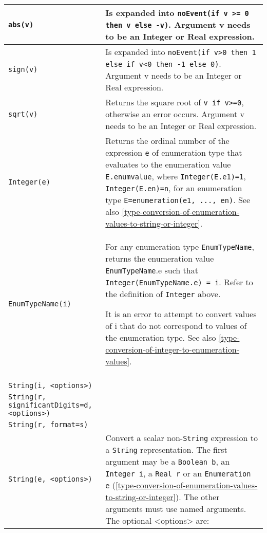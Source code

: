 \begin{longtable}{|p{4.5cm}|p{10cm}|} \hline
\endhead
\lstinline!abs(v)! & Is expanded into \lstinline!noEvent(if v >= 0 then v else -v)!. Argument v needs to be an Integer or Real expression.\\ \hline
\lstinline!sign(v)! & Is expanded into \lstinline!noEvent(if v>0 then 1 else if v<0 then -1 else 0)!. Argument v needs to be an Integer or Real
expression.\\ \hline
\lstinline!sqrt(v)! & Returns the square root of \lstinline!v if v>=0!, otherwise
an error occurs. Argument v needs to be an Integer or Real
expression.\\ \hline

\lstinline!Integer(e)! & Returns the ordinal number of the expression \lstinline!e! of
enumeration type that evaluates to the enumeration value \lstinline!E.enumvalue!,
where \lstinline!Integer(E.e1)=1!, \lstinline!Integer(E.en)=n!, for an enumeration type
\lstinline!E=enumeration(e1, ..., en)!. See also \autoref{type-conversion-of-enumeration-values-to-string-or-integer}.\\ \hline
\lstinline!EnumTypeName(i)! &
For any enumeration type \lstinline!EnumTypeName!, returns the enumeration
value \lstinline!EnumTypeName!.e such that \lstinline!Integer(EnumTypeName.e) = i!. Refer to the definition of
\lstinline!Integer! above.

It is an error to attempt to convert values of i that do not correspond
to values of the enumeration type. See also \autoref{type-conversion-of-integer-to-enumeration-values}.
\\ \hline

\begin{tabular}{@{}p{4.5cm}@{}}
\lstinline!String(b, <options>)!\\
\lstinline!String(i, <options>)!\\
\lstinline!String(r,!
\hspace*{1ex}\lstinline!significantDigits=d,!
\hspace*{1ex}\lstinline!<options>)!\\
\lstinline!String(r, format=s)!\\
\lstinline!String(e, <options>)!
\end{tabular}
&
Convert a scalar non-\lstinline!String! expression to a \lstinline!String! representation. The
first argument may be a \lstinline!Boolean b!, an \lstinline!Integer i!, a \lstinline!Real r! or an
\lstinline!Enumeration e! (\autoref{type-conversion-of-enumeration-values-to-string-or-integer}). The other arguments must use named
arguments. The optional \textless{}options\textgreater{} are:


\end{longtable}
